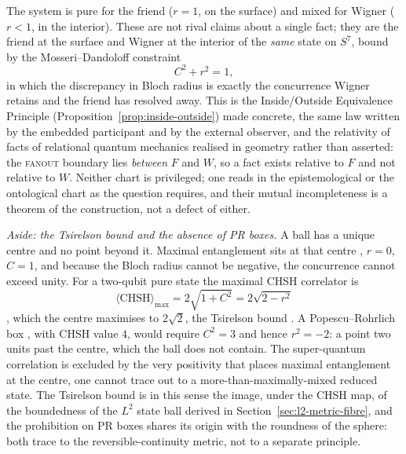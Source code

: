 The system is pure for the friend ($r=1$, on the surface) and mixed for Wigner
($r<1$, in the interior). These are not rival claims about a single fact; they are
the friend at the surface and Wigner at the interior of the \emph{same} state on
$S^{7}$, bound by the Mosseri--Dandoloff constraint
\begin{equation}
  C^{2}+r^{2}=1,
\end{equation}
in which the discrepancy in Bloch radius is exactly the concurrence Wigner
retains and the friend has resolved away. This is the Inside/Outside Equivalence
Principle (Proposition~\ref{prop:inside-outside}) made concrete, the same law written by the embedded participant and by
the external observer, and the relativity of facts of relational quantum
mechanics \autocite{Rovelli1996a} realised in geometry rather than asserted: the
\textsc{fanout} boundary lies \emph{between} $F$ and $W$, so a fact exists
relative to $F$ and not relative to $W$. Neither chart is privileged; one reads in
the epistemological or the ontological chart as the question requires, and their
mutual incompleteness is a theorem of the construction, not a defect of either.

\medskip
\noindent\emph{Aside: the Tsirelson bound and the absence of PR boxes.}
\label{sec:tsirelson}
A ball has a unique centre and no point beyond it. Maximal entanglement sits at
that centre \autocite{mosseri2001hopf}, $r=0$, $C=1$, and because the
Bloch radius cannot be negative, the concurrence cannot exceed unity. For a
two-qubit pure state the maximal CHSH correlator is
\begin{equation}
  \langle\mathrm{CHSH}\rangle_{\max}=2\sqrt{1+C^{2}}=2\sqrt{2-r^{2}}  
\end{equation}
\autocite{VerstraeteWolf2002},
which the centre maximises to $2\sqrt{2}$, the Tsirelson bound
\autocite{Cirelson1980QuantumInequality}. A Popescu--Rohrlich box \autocite{PopescuRohrlich1994},
with CHSH value $4$, would require $C^{2}=3$ and hence $r^{2}=-2$: a point two
units past the centre, which the ball does not contain. The super-quantum
correlation is excluded by the very positivity that places maximal entanglement
at the centre, one cannot trace out to a more-than-maximally-mixed reduced
state. The Tsirelson bound is in this sense the image, under the CHSH map, of the
boundedness of the $L^{2}$ state ball derived in
Section~\ref{sec:l2-metric-fibre}, and the prohibition on PR boxes shares its
origin with the roundness of the sphere: both trace to the reversible-continuity
metric, not to a separate principle.

